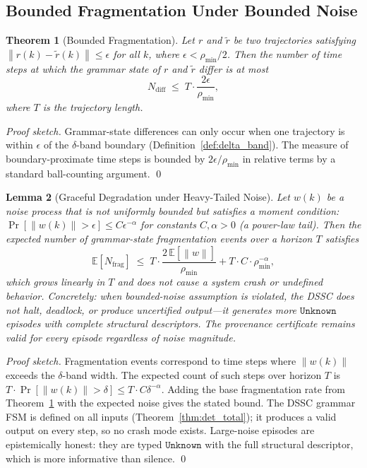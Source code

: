 \documentclass[11pt,a4paper]{article}
\theoremstyle{plain}
\newtheorem{theorem}{Theorem}[section]
\newtheorem{lemma}[theorem]{Lemma}
\theoremstyle{definition}
\theoremstyle{remark}
\newcommand{\norm}[1]{\left\|#1\right\|}
\begin{document}
\subsection{Bounded Fragmentation Under Bounded Noise}

\begin{theorem}[Bounded Fragmentation]
\label{thm:fragmentation}
  Let $r$ and $\tilde{r}$ be two trajectories satisfying $\norm{r(k) - \tilde{r}(k)} \leq
  \epsilon$ for all $k$, where $\epsilon < \rho_{\min}/2$. Then the number of time steps at
  which the grammar state of $r$ and $\tilde{r}$ differ is at most
  \begin{equation}
    N_{\text{diff}} \;\leq\; T \cdot \frac{2\epsilon}{\rho_{\min}},
  \end{equation}
  where $T$ is the trajectory length.
\end{theorem}
\begin{proof}[Proof sketch]
  Grammar-state differences can only occur when one trajectory is within $\epsilon$ of the
  $\delta$-band boundary (Definition~\ref{def:delta_band}). The measure of boundary-proximate
  time steps is bounded by $2\epsilon / \rho_{\min}$ in relative terms by a standard
  ball-counting argument. \qed
\end{proof}

\begin{lemma}[Graceful Degradation under Heavy-Tailed Noise]
\label{lem:graceful_degradation}
  Let $w(k)$ be a noise process that is \emph{not} uniformly bounded but satisfies a
  moment condition: $\Pr[\norm{w(k)} > \epsilon] \leq C \epsilon^{-\alpha}$ for constants
  $C, \alpha > 0$ (a power-law tail). Then the \emph{expected} number of grammar-state
  fragmentation events over a horizon $T$ satisfies
  \begin{equation}
    \mathbb{E}[N_{\text{frag}}] \;\leq\; T \cdot \frac{2\,\mathbb{E}[\norm{w}]}{\rho_{\min}}
      + T \cdot C \cdot \rho_{\min}^{-\alpha},
  \end{equation}
  which grows \emph{linearly} in $T$ and does not cause a system crash or undefined behavior.
  Concretely: when bounded-noise assumption is violated, the DSSC does not halt, deadlock,
  or produce uncertified output---it generates more $\mathtt{Unknown}$ episodes with complete
  structural descriptors. The provenance certificate remains valid for every episode regardless
  of noise magnitude.
\end{lemma}
\begin{proof}[Proof sketch]
  Fragmentation events correspond to time steps where $\norm{w(k)}$ exceeds the $\delta$-band
  width. The expected count of such steps over horizon $T$ is
  $T \cdot \Pr[\norm{w(k)} > \delta] \leq T \cdot C \delta^{-\alpha}$. Adding the base
  fragmentation rate from Theorem~\ref{thm:fragmentation} with the expected noise gives the
  stated bound. The DSSC grammar FSM is defined on all inputs (Theorem~\ref{thm:det_total});
  it produces a valid output on every step, so no crash mode exists. Large-noise episodes are
  epistemically honest: they are typed $\mathtt{Unknown}$ with the full structural descriptor,
  which is more informative than silence. \qed
\end{proof}
\end{document}
